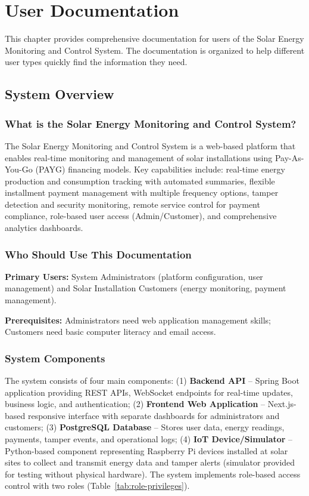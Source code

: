 \chapter{User Documentation}
\label{ch:user}

This chapter provides comprehensive documentation for users of the Solar Energy Monitoring and Control System. The documentation is organized to help different user types quickly find the information they need.

\section{System Overview}
\label{sec:system-overview}

\subsection{What is the Solar Energy Monitoring and Control System?}
\label{subsec:system-description}

The Solar Energy Monitoring and Control System is a web-based platform that enables real-time monitoring and management of solar installations using Pay-As-You-Go (PAYG) financing models. Key capabilities include: real-time energy production and consumption tracking with automated summaries, flexible installment payment management with multiple frequency options, tamper detection and security monitoring, remote service control for payment compliance, role-based user access (Admin/Customer), and comprehensive analytics dashboards.

\subsection{Who Should Use This Documentation}
\label{subsec:target-audience}

\textbf{Primary Users:} System Administrators (platform configuration, user management) and Solar Installation Customers (energy monitoring, payment management).

\textbf{Prerequisites:} Administrators need web application management skills; Customers need basic computer literacy and email access.

\subsection{System Components}
\label{subsec:system-components}

The system consists of four main components: (1) \textbf{Backend API} -- Spring Boot application providing REST APIs, WebSocket endpoints for real-time updates, business logic, and authentication; (2) \textbf{Frontend Web Application} -- Next.js-based responsive interface with separate dashboards for administrators and customers; (3) \textbf{PostgreSQL Database} -- Stores user data, energy readings, payments, tamper events, and operational logs; (4) \textbf{IoT Device/Simulator} -- Python-based component representing Raspberry Pi devices installed at solar sites to collect and transmit energy data and tamper alerts (simulator provided for testing without physical hardware). The system implements role-based access control with two roles (Table~\ref{tab:role-privileges}).

